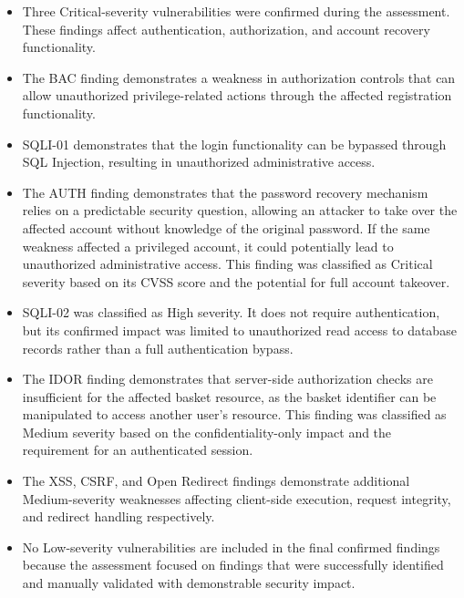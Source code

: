 \begin{itemize}

    \item Three Critical-severity vulnerabilities were confirmed
    during the assessment. These findings affect authentication,
    authorization, and account recovery functionality.

    \item The BAC finding demonstrates a weakness in authorization
    controls that can allow unauthorized privilege-related actions
    through the affected registration functionality.

    \item SQLI-01 demonstrates that the login functionality can be
    bypassed through SQL Injection, resulting in unauthorized
    administrative access.

    \item The AUTH finding demonstrates that the password recovery
    mechanism relies on a predictable security question, allowing an
    attacker to take over the affected account without knowledge of
    the original password. If the same weakness affected a privileged
    account, it could potentially lead to unauthorized administrative
    access. This finding was classified as Critical severity based on
    its CVSS score and the potential for full account takeover.

    \item SQLI-02 was classified as High severity. It does not
    require authentication, but its confirmed impact was limited to
    unauthorized read access to database records rather than a
    full authentication bypass.

    \item The IDOR finding demonstrates that server-side authorization
    checks are insufficient for the affected basket resource, as the
    basket identifier can be manipulated to access another user's
    resource. This finding was classified as Medium severity based on
    the confidentiality-only impact and the requirement for an
    authenticated session.

    \item The XSS, CSRF, and Open Redirect findings demonstrate
    additional Medium-severity weaknesses affecting client-side
    execution, request integrity, and redirect handling respectively.

    \item No Low-severity vulnerabilities are included in the final
    confirmed findings because the assessment focused on findings
    that were successfully identified and manually validated with
    demonstrable security impact.

\end{itemize}

